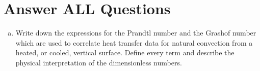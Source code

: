 \documentclass[calculator,datasheet,handbook]{exam}
\begin{document}
\part{Answer ALL Questions}
\begin{question}\vspace{-2\baselineskip}
  \begin{enumerate}[a)]
  \item Write down the expressions for the Prandtl number and the
    Grashof number which are used to correlate heat transfer data for
    natural convection from a heated, or cooled, vertical
    surface. Define every term and describe the physical
    interpretation of the dimensionless numbers.%
\end{enumerate}
\end{question}
\end{document}
